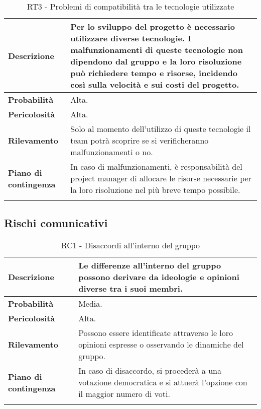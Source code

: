 \begin{longtable}{ | l | p{10cm} | }
    \hline
    \textbf{Descrizione} & Per lo sviluppo del progetto è necessario utilizzare diverse tecnologie. I malfunzionamenti di queste tecnologie non dipendono dal gruppo e la loro risoluzione può richiedere tempo e risorse, incidendo così sulla velocità e sui costi del progetto. \\
    \hline
    \textbf{Probabilità} & Alta. \\
    \hline
    \textbf{Pericolosità} & Alta. \\
    \hline
    \textbf{Rilevamento} & Solo al momento dell'utilizzo di queste tecnologie il team potrà scoprire se si verificheranno malfunzionamenti o no.  \\
    \hline
    \textbf{Piano di contingenza} & In caso di malfunzionamenti, è responsabilità del project manager di allocare le risorse necessarie per la loro risoluzione nel più breve tempo possibile.\\
    \hline
    \caption{RT3 - Problemi di compatibilità tra le tecnologie utilizzate}
    \label{table:7}
\end{longtable}


\newpage


\subsection{Rischi comunicativi}
\begin{longtable}{ | l | p{10cm} | }
    \hline
    \textbf{Descrizione} & Le differenze all'interno del gruppo possono derivare da ideologie e opinioni diverse tra i suoi membri. \\
    \hline
    \textbf{Probabilità} & Media. \\
    \hline
    \textbf{Pericolosità} & Alta. \\
    \hline
    \textbf{Rilevamento} & Possono essere identificate attraverso le loro opinioni espresse o osservando le dinamiche del gruppo. \\
    \hline
    \textbf{Piano di contingenza} & In caso di disaccordo, si procederà a una votazione democratica e si attuerà l'opzione con il maggior numero di voti. \\
    \hline
    \caption{RC1 - Disaccordi all'interno del gruppo}
    \label{table:8}
\end{longtable}

